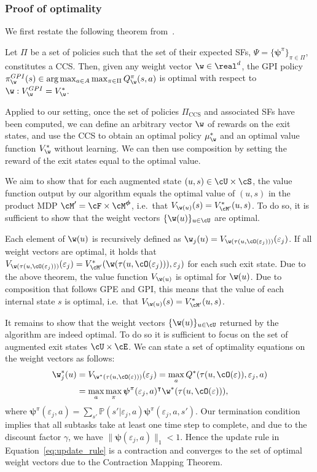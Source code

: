\subsubsection{Proof of optimality} We first restate the following theorem from~\citet{Alegre2022}.

\begin{theorem}
Let $\Pi$ be a set of policies such that the set of their expected SFs, $\Psi=\{\boldsymbol{\psi}^\pi\}_{\pi\in\Pi}$, constitutes a CCS. Then, given any weight vector $\w\in\real^d$, the GPI policy $\pi_\w^{GPI}(s) \in \arg \max_{a\in A} \max_{\pi\in\Pi} Q_\w^\pi(s,a)$ is
optimal with respect to ${\w: V_\w^{GPI} = V_\w^*}$.
\end{theorem}

\noindent
Applied to our setting, once the set of policies $\Pi_\text{CCS}$ and associated SFs have been computed, we can define an arbitrary vector $\w$ of rewards on the exit states, and use the CCS to obtain an optimal policy $\mu_\w^*$ and an optimal value function $V_\w^*$ without learning. We can then use composition by setting the reward of the exit states equal to the optimal value.

We aim to show that for each augmented state ${(u,s)\in\cU\times\cS}$, the value function output by our algorithm equals the optimal value of $(u,s)$ in the product MDP $\cM'=\cF\times\cM^{\boldsymbol{\phi}}$, i.e.~that $V_{\w(u)}(s)=V_{\cM'}^*(u,s)$. To do so, it is sufficient to show that the weight vectors $\{\w(u)\}_{u\in\cU}$ are optimal.

 Each element of $\w(u)$ is recursively defined as $\w_j(u)=V_{\w(\tau(u,\cO(\varepsilon_j)))}(\varepsilon_j)$. If all weight vectors are optimal, it holds that $V_{\w(\tau(u,\cO(\varepsilon_j)))}(\varepsilon_j)=V_{\cM'}^*(\w(\tau(u,\cO(\varepsilon_j))),\varepsilon_j)$ for each such exit state. Due to the above theorem, the value function $V_{\w(u)}$ is optimal for $\w(u)$. Due to composition that follows GPE and GPI, this means that the value of each internal state $s$ is optimal, i.e.~that $V_{\w(u)}(s)=V_{\cM'}^*(u,s)$.

It remains to show that the weight vectors $\{\w(u)\}_{u\in\cU}$ returned by the algorithm are indeed optimal. To do so it is sufficient to focus on the set of augmented exit states $\cU\times\cE$. We can state a set of optimality equations on the weight vectors as follows:
\begin{align*}
\w_j^*(u) &= V_{\w^*(\tau(u,\cO(\varepsilon)))}(\varepsilon_j)= \max_a Q^*(\tau(u,\cO(\varepsilon)),\varepsilon_j,a)\\
 &= \max_a\max_\pi {\boldsymbol{\psi}}^\pi(\varepsilon_j,a)^\intercal \w^*(\tau(u,\cO(\varepsilon))),
\end{align*}
where ${\boldsymbol{\psi}}^\pi(\varepsilon_j,a)=\sum_{s'}\mathbb{P}(s'|\varepsilon_j,a)\boldsymbol{\psi}^\pi(\varepsilon_j,a,s')$. Our termination condition implies that all subtasks take at least one time step to complete, and due to the discount factor $\gamma$, we have $\lVert\boldsymbol{\psi}(\varepsilon_j,a)\rVert_1<1$. Hence the update rule in Equation~\eqref{eq:update_rule} is a contraction and converges to the set of optimal weight vectors due to the Contraction Mapping Theorem.

